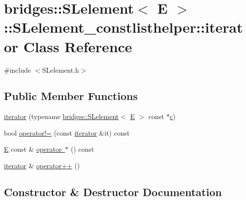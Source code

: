\hypertarget{classbridges_1_1_s_lelement_1_1_s_lelement__constlisthelper_1_1iterator}{}\section{bridges\+::S\+Lelement$<$ E $>$\+::S\+Lelement\+\_\+constlisthelper\+::iterator Class Reference}
\label{classbridges_1_1_s_lelement_1_1_s_lelement__constlisthelper_1_1iterator}


{\ttfamily \#include $<$S\+Lelement.\+h$>$}

\subsection*{Public Member Functions}
\begin{DoxyCompactItemize}
\item 
\mbox{\hyperlink{classbridges_1_1_s_lelement_1_1_s_lelement__constlisthelper_1_1iterator_aad183529de83d5c0a911a2407a31f829}{iterator}} (typename \mbox{\hyperlink{classbridges_1_1_s_lelement}{bridges\+::\+S\+Lelement}}$<$ \mbox{\hyperlink{namespacebridges_acfb0a4f7877d8f63de3e6862004c50eda3a3ea00cfc35332cedf6e5e9a32e94da}{E}} $>$ const $\ast$\mbox{\hyperlink{namespacebridges_acfb0a4f7877d8f63de3e6862004c50eda4a8a08f09d37b73795649038408b5f33}{c}})
\item 
bool \mbox{\hyperlink{classbridges_1_1_s_lelement_1_1_s_lelement__constlisthelper_1_1iterator_ae0a1715327321142f4f56d729a615a8d}{operator!=}} (const \mbox{\hyperlink{classbridges_1_1_s_lelement_1_1_s_lelement__constlisthelper_1_1iterator}{iterator}} \&it) const
\item 
\mbox{\hyperlink{namespacebridges_acfb0a4f7877d8f63de3e6862004c50eda3a3ea00cfc35332cedf6e5e9a32e94da}{E}} const  \& \mbox{\hyperlink{classbridges_1_1_s_lelement_1_1_s_lelement__constlisthelper_1_1iterator_a5537a3c5a73d5ba022e8fc01e6d2b559}{operator $\ast$}} () const
\item 
\mbox{\hyperlink{classbridges_1_1_s_lelement_1_1_s_lelement__constlisthelper_1_1iterator}{iterator}} \& \mbox{\hyperlink{classbridges_1_1_s_lelement_1_1_s_lelement__constlisthelper_1_1iterator_a1de6ed4b50ede98a435fd92ebc318cfb}{operator++}} ()
\end{DoxyCompactItemize}


\subsection{Constructor \& Destructor Documentation}
\mbox{\label{classbridges_1_1_s_lelement_1_1_s_lelement__constlisthelper_1_1iterator_aad183529de83d5c0a911a2407a31f829}} 
